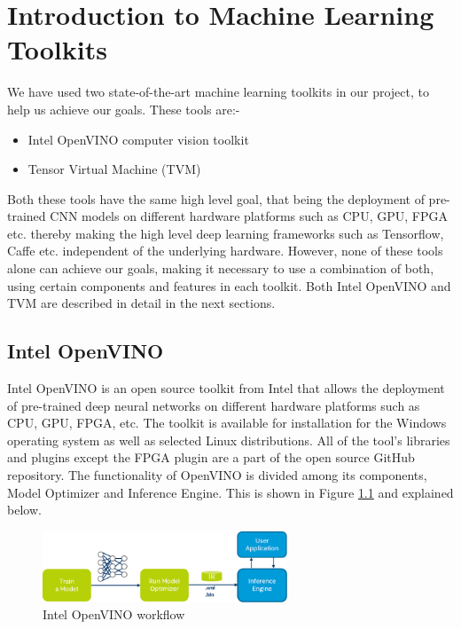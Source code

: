 \chapter{Introduction to Machine Learning Toolkits}
\label{chp:Toolkits}
We have used two state-of-the-art machine learning toolkits in our project, to help us achieve our goals. These tools are:-
\begin{itemize}
    \item Intel OpenVINO computer vision toolkit
    \item Tensor Virtual Machine (TVM)
\end{itemize}
Both these tools have the same high level goal, that being the deployment of pre-trained CNN models on different hardware platforms such as CPU, GPU, FPGA etc. thereby making the high level deep learning frameworks such as Tensorflow, Caffe etc. independent of the underlying hardware. However, none of these tools alone can achieve our goals, making it necessary to use a combination of both, using certain components and features in each toolkit. Both Intel OpenVINO and TVM are described in detail in the next sections.  

\section{Intel OpenVINO}


Intel OpenVINO is an open source toolkit from Intel that allows the deployment of pre-trained deep neural networks on different hardware platforms such as CPU, GPU, FPGA, etc. The toolkit is available for installation for the Windows operating system as well as selected Linux distributions. All of the tool's libraries and plugins except the FPGA plugin are a part of the open source GitHub repository.
The functionality of OpenVINO is divided among its components, Model Optimizer and Inference Engine. This is shown in Figure \ref{fig:OpenVINO_workflow} and explained below. 
\begin{figure}[!hbpt]
    \centering
    \includegraphics[width=0.65\textwidth]{img/openVINO_workflow.png}
    \caption{Intel OpenVINO workflow \citep[][]{openvino_fig}}
    \label{fig:OpenVINO_workflow}
\end{figure} 

